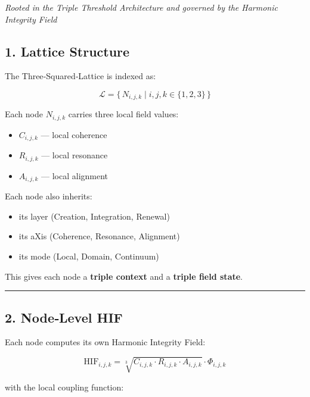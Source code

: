 \emph{Rooted in the Triple Threshold Architecture and governed by the Harmonic Integrity Field}

\subsection{1. Lattice Structure}\label{lattice-structure}

The Three‑Squared‑Lattice is indexed as:

\[
\mathcal{L} = \{\, N_{i,j,k} \mid i,j,k \in \{1,2,3\} \,\}
\]

Each node \(N_{i,j,k}\) carries three local field values:

\begin{itemize}
\tightlist
\item
  \(C_{i,j,k}\) --- local coherence\\
\item
  \(R_{i,j,k}\) --- local resonance\\
\item
  \(A_{i,j,k}\) --- local alignment
\end{itemize}

Each node also inherits:

\begin{itemize}
\tightlist
\item
  its layer (Creation, Integration, Renewal)\\
\item
  its aXis (Coherence, Resonance, Alignment)\\
\item
  its mode (Local, Domain, Continuum)
\end{itemize}

This gives each node a \textbf{triple context} and a \textbf{triple field state}.

\begin{center}\rule{0.5\linewidth}{0.5pt}\end{center}

\subsection{2. Node‑Level HIF}\label{nodelevel-hif}

Each node computes its own Harmonic Integrity Field:

\[
\text{HIF}_{i,j,k} = \sqrt[3]{C_{i,j,k} \cdot R_{i,j,k} \cdot A_{i,j,k}} \cdot \Phi_{i,j,k}
\]

with the local coupling function:


